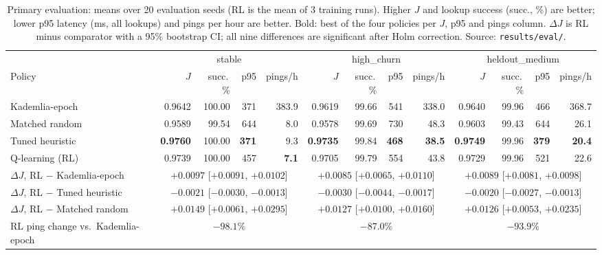 \documentclass[9pt,twocolumn]{extarticle}
\begin{document}
\begin{table}[t]
\centering\small
\caption{Primary evaluation: means over 20 evaluation seeds (RL is the mean of 3 training runs). Higher $J$ and lookup success (succ., \%) are better; lower p95 latency (ms, all lookups) and pings per hour are better. Bold: best of the four policies per $J$, p95 and pings column. $\Delta J$ is RL minus comparator with a 95\% bootstrap CI; all nine differences are significant after Holm correction. Source: \texttt{results/eval/}.}
\label{tab:main}
\setlength{\tabcolsep}{3.6pt}
\begin{tabular}{@{}l *{3}{r r r r}@{}}
\toprule
 & \multicolumn{4}{c}{stable} & \multicolumn{4}{c}{high\_churn} & \multicolumn{4}{c}{heldout\_medium}\\
\cmidrule(lr){2-5}\cmidrule(lr){6-9}\cmidrule(l){10-13}
Policy & $J$ & succ.\,\% & p95 & pings/h & $J$ & succ.\,\% & p95 & pings/h & $J$ & succ.\,\% & p95 & pings/h\\
\midrule
Kademlia-epoch  & 0.9642 & 100.00 & 371 & 383.9 & 0.9619 & 99.66 & 541 & 338.0 & 0.9640 & 99.96 & 466 & 368.7\\
Matched random  & 0.9589 & 99.54 & 644 & 8.0 & 0.9578 & 99.69 & 730 & 48.3 & 0.9603 & 99.43 & 644 & 26.1\\
Tuned heuristic & \textbf{0.9760} & 100.00 & \textbf{371} & 9.3 & \textbf{0.9735} & 99.84 & \textbf{468} & \textbf{38.5} & \textbf{0.9749} & 99.96 & \textbf{379} & \textbf{20.4}\\
Q-learning (RL) & 0.9739 & 100.00 & 457 & \textbf{7.1} & 0.9705 & 99.79 & 554 & 43.8 & 0.9729 & 99.96 & 521 & 22.6\\
\midrule
$\Delta J$, RL $-$ Kademlia-epoch & \multicolumn{4}{c}{$+0.0097$ [$+0.0091$, $+0.0102$]} & \multicolumn{4}{c}{$+0.0085$ [$+0.0065$, $+0.0110$]} & \multicolumn{4}{c}{$+0.0089$ [$+0.0081$, $+0.0098$]}\\
$\Delta J$, RL $-$ Tuned heuristic & \multicolumn{4}{c}{$-0.0021$ [$-0.0030$, $-0.0013$]} & \multicolumn{4}{c}{$-0.0030$ [$-0.0044$, $-0.0017$]} & \multicolumn{4}{c}{$-0.0020$ [$-0.0027$, $-0.0013$]}\\
$\Delta J$, RL $-$ Matched random & \multicolumn{4}{c}{$+0.0149$ [$+0.0061$, $+0.0295$]} & \multicolumn{4}{c}{$+0.0127$ [$+0.0100$, $+0.0160$]} & \multicolumn{4}{c}{$+0.0126$ [$+0.0053$, $+0.0235$]}\\
RL ping change vs.\ Kademlia-epoch & \multicolumn{4}{c}{$-98.1\%$} & \multicolumn{4}{c}{$-87.0\%$} & \multicolumn{4}{c}{$-93.9\%$}\\
\bottomrule
\end{tabular}
\end{table}
\end{document}
